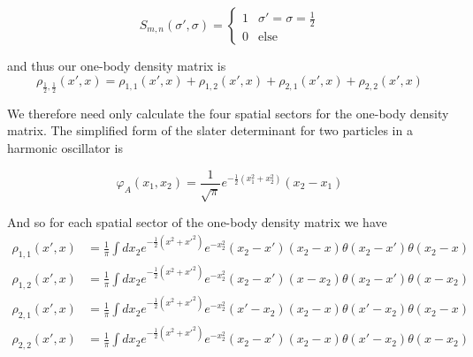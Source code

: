 \documentclass[onecolumn,english,aps,pra]{revtex4}
\begin{document}
\begin{equation}
S_{m, n}(\sigma', \sigma) = 
\begin{cases}
	1 & \sigma' = \sigma = \frac{1}{2}\\
	0 & \text{else}
\end{cases}
\end{equation}

and thus our one-body density matrix is
\begin{equation}
\rho_{\frac{1}{2}, \frac{1}{2}}(x', x) = 
\rho_{1, 1}(x', x) + \rho_{1, 2}(x', x)
+ \rho_{2, 1}(x', x) + \rho_{2, 2}(x', x)
\end{equation}

We therefore need only calculate the four spatial sectors for the one-body density matrix. The simplified form of the slater determinant for two particles in a harmonic oscillator is

\begin{equation}
\varphi_A(x_1, x_2) = \frac{1}{\sqrt{\pi}} e^{-\frac{1}{2} (x_1^2 + x_2^2) } (x_2 - x_1)
\end{equation}

And so for each spatial sector of the one-body density matrix we have
\begin{align*}
\rho_{1, 1}(x', x) &= \frac{1}{\pi} \int dx_2 e^{-\frac{1}{2} (x^2 + x'^2) } 
 e^{-x_2^2} (x_2 - x')(x_2 - x) \theta(x_2 - x') \theta(x_2 - x)\\
\rho_{1, 2}(x', x) &= \frac{1}{\pi} \int dx_2 
e^{-\frac{1}{2} (x^2 + x'^2) } e^{-x_2^2} (x_2 - x')(x - x_2) 
\theta(x_2 - x') \theta(x - x_2)\\
\rho_{2, 1}(x', x) &= \frac{1}{\pi} \int dx_2 
e^{-\frac{1}{2} (x^2 + x'^2) } e^{-x_2^2} (x' - x_2)(x_2 - x) 
\theta(x' - x_2) \theta(x_2 - x)\\
\rho_{2,2}(x', x) &= \frac{1}{\pi} \int dx_2 e^{-\frac{1}{2} (x^2 + x'^2) } 
e^{-x_2^2} (x_2 - x')(x_2 - x) \theta(x' - x_2) \theta(x - x_2)
\end{align*}
\end{document}
